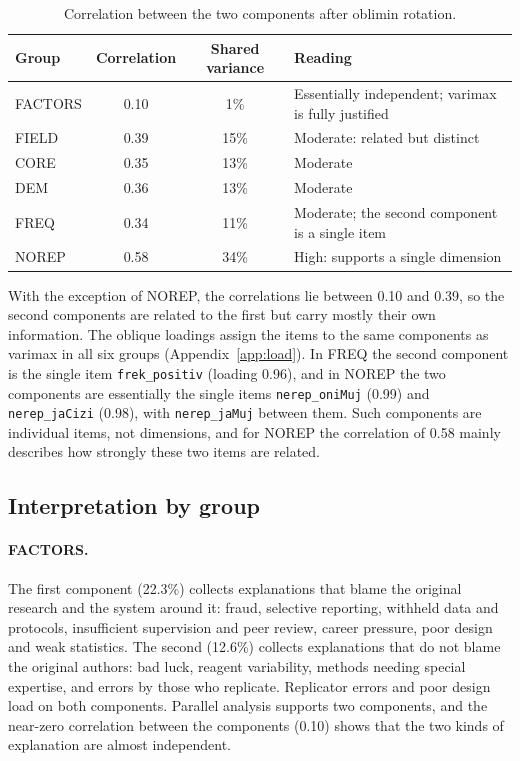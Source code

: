 \documentclass[11pt,a4paper]{article}
\newcommand{\var}[1]{\texttt{#1}}
\begin{document}
\begin{table}[ht]
\centering
\small
\begin{tabular}{@{}l c c L{6.2cm}@{}}
\toprule
Group & Correlation & Shared variance & Reading\\
\midrule
FACTORS & 0.10 & 1\%  & Essentially independent; varimax is fully justified\\
FIELD   & 0.39 & 15\% & Moderate: related but distinct\\
CORE    & 0.35 & 13\% & Moderate\\
DEM     & 0.36 & 13\% & Moderate\\
FREQ    & 0.34 & 11\% & Moderate; the second component is a single item\\
NOREP   & 0.58 & 34\% & High: supports a single dimension\\
\bottomrule
\end{tabular}
\caption{Correlation between the two components after oblimin rotation.}
\label{tab:phi}
\end{table}

With the exception of NOREP, the correlations lie between 0.10 and 0.39, so the second components are related to the first but carry mostly their own information. The oblique loadings assign the items to the same components as varimax in all six groups (Appendix~\ref{app:load}). In FREQ the second component is the single item \var{frek\_positiv} (loading 0.96), and in NOREP the two components are essentially the single items \var{nerep\_oniMuj} (0.99) and \var{nerep\_jaCizi} (0.98), with \var{nerep\_jaMuj} between them. Such components are individual items, not dimensions, and for NOREP the correlation of 0.58 mainly describes how strongly these two items are related.

\subsection{Interpretation by group}

\paragraph{FACTORS.} The first component (22.3\%) collects explanations that blame the original research and the system around it: fraud, selective reporting, withheld data and protocols, insufficient supervision and peer review, career pressure, poor design and weak statistics. The second (12.6\%) collects explanations that do not blame the original authors: bad luck, reagent variability, methods needing special expertise, and errors by those who replicate. Replicator errors and poor design load on both components. Parallel analysis supports two components, and the near-zero correlation between the components (0.10) shows that the two kinds of explanation are almost independent.
\end{document}
